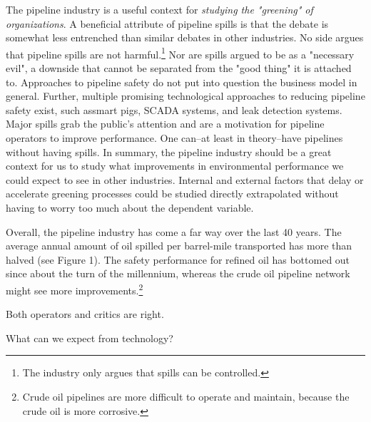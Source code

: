 The pipeline industry is a useful context for \textit{studying the "greening" of organizations}. A beneficial attribute of pipeline spills is that the debate is somewhat less entrenched than similar debates in other industries. No side argues that pipeline spills are not harmful.\footnote{The industry only argues that spills can be controlled.} Nor are spills argued to be as a "necessary evil", a downside that cannot be separated from the "good thing" it is attached to. Approaches to pipeline safety do not put into question the business model in general. Further, multiple promising technological approaches to reducing pipeline safety exist, such assmart pigs, SCADA systems, and leak detection systems. Major spills grab the public's attention and are a motivation for pipeline operators to improve performance. One can--at least in theory--have pipelines without having spills. In summary, the pipeline industry should be a great context for us to study what improvements in environmental performance we could expect to see in other industries. Internal and external factors that delay or accelerate greening processes could be studied directly extrapolated without having to worry too much about the dependent variable.


Overall, the pipeline industry has come a far way over the last 40 years. The average annual amount of oil spilled per barrel-mile transported has more than halved (see Figure 1). The safety performance for refined oil has bottomed out since about the turn of the millennium, whereas the crude oil pipeline network might see more improvements.\footnote{Crude oil pipelines are more difficult to operate and maintain, because the crude oil is more corrosive.}

Both operators and critics are right.


What can we expect from technology?
